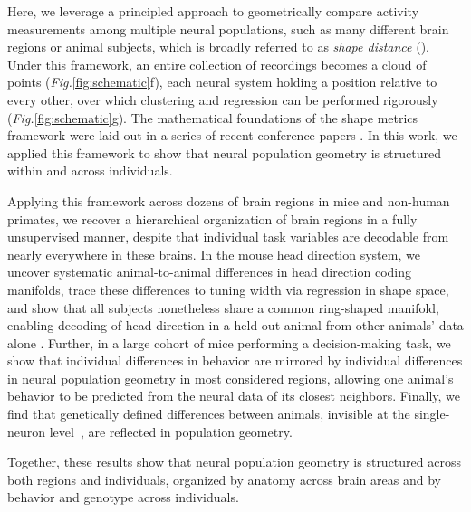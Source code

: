 Here, we leverage a principled approach to geometrically compare activity measurements among multiple neural populations, such as many different brain regions or animal subjects, which is broadly referred to as \emph{shape distance} (\cite{Williams2021}). Under this framework, an entire collection of recordings becomes a cloud of points (\textit{Fig.}\ref{fig:schematic}f), each neural system holding a position relative to every other, over which clustering and regression can be performed rigorously (\textit{Fig.}\ref{fig:schematic}g). The mathematical foundations of the shape metrics framework were laid out in a series of recent conference papers \parencite{Williams2021,pospisil2023estimating,harvey2024duality,khosla2024soft}.
In this work, we applied this framework to show that neural population geometry is structured within and across individuals.

Applying this framework across dozens of brain regions in mice and non-human primates, we recover a hierarchical organization of brain regions in a fully unsupervised manner, despite that individual task variables are decodable from nearly everywhere in these brains. In the mouse head direction system, we uncover systematic animal-to-animal differences in head direction coding manifolds, trace these differences to tuning width via regression in shape space, and show that all subjects nonetheless share a common ring-shaped manifold, enabling decoding of head direction in a held-out animal from other animals' data alone \parencite{safaie2023preserved}. Further, in a large cohort of mice performing a decision-making task, we show that individual differences in behavior are mirrored by individual differences in neural population geometry in most considered regions, allowing one animal's behavior to be predicted from the neural data of its closest neighbors. Finally, we find that genetically defined differences between animals, invisible at the single-neuron level~\parencite{noel2025}, are reflected in population geometry.

Together, these results show that neural population geometry is structured across both regions and individuals, organized by anatomy across brain areas and by behavior and genotype across individuals.